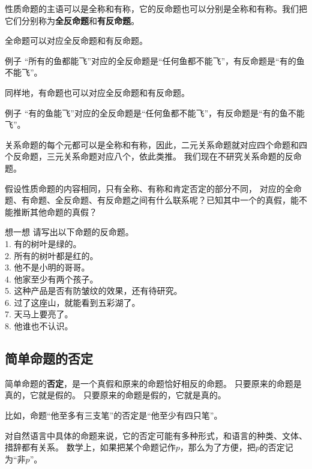 \documentclass[12pt,UTF8,a4paper]{article}
\begin{document}
性质命题的主语可以是全称和有称，它的反命题也可以分别是全称和有称。我们把它们分别称为\textbf{全反命题}和\textbf{有反命题}。

全命题可以对应全反命题和有反命题。

\begin{blockin}{例子}
    “所有的鱼都能飞”对应的全反命题是“任何鱼都不能飞”，有反命题是“有的鱼不能飞”。
\end{blockin}

同样地，有命题也可以对应全反命题和有反命题。

\begin{blockin}{例子}
    “有的鱼能飞”对应的全反命题是“任何鱼都不能飞”，有反命题是“有的鱼不能飞”。
\end{blockin}

关系命题的每个元都可以是全称和有称，因此，二元关系命题就对应四个命题和四个反命题，三元关系命题对应八个，依此类推。
我们现在不研究关系命题的反命题。

假设性质命题的内容相同，只有全称、有称和肯定否定的部分不同，
对应的全命题、有命题、全反命题、有反命题之间有什么联系呢？已知其中一个的真假，能不能推断其他命题的真假？

\begin{blockaft}{想一想}
    请写出以下命题的反命题。\\
    1. 有的树叶是绿的。 \\
    2. 所有的树叶都是红的。\\
    3. 他不是小明的哥哥。\\
    4. 他家至少有两个孩子。 \\
    5. 这种产品是否有防皱纹的效果，还有待研究。\\
    6. 过了这座山，就能看到五彩湖了。\\
    7. 天马上要亮了。 \\
    8. 他谁也不认识。
\end{blockaft}

\subsection{简单命题的否定}

简单命题的\textbf{否定}，是一个真假和原来的命题恰好相反的命题。
只要原来的命题是真的，它就是假的。
只要原来的命题是假的，它就是真的。

比如，命题“他至多有三支笔”的否定是“他至少有四只笔”。

对自然语言中具体的命题来说，它的否定可能有多种形式，和语言的种类、文体、措辞都有关系。
数学上，如果把某个命题记作$p$，那么为了方便，把$p$的否定记为“非$p$”。
\end{document}
